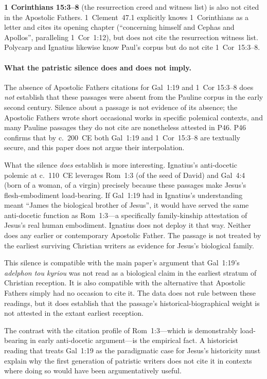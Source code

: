 \documentclass[12pt,oneside]{article}
\begin{document}
\textbf{1 Corinthians 15:3--8} (the resurrection creed and witness
list) is also not cited in the Apostolic Fathers.  1~Clement~47.1
explicitly knows 1~Corinthians as a letter and cites its
opening chapter (\enquote{concerning himself and Cephas and
Apollos}, paralleling 1~Cor~1:12), but does not cite the
resurrection witness list.  Polycarp and Ignatius likewise know
Paul's corpus but do not cite 1~Cor~15:3--8.

\paragraph{What the patristic silence does and does not imply.}
The absence of Apostolic Fathers citations for Gal~1:19 and 1~Cor
15:3--8 does \textit{not} establish that these passages were
absent from the Pauline corpus in the early second century.
Silence about a passage is not evidence of its absence; the
Apostolic Fathers wrote short occasional works in specific
polemical contexts, and many Pauline passages they do not cite
are nonetheless attested in P46.  P46 confirms that by c.~200~CE
both Gal~1:19 and 1~Cor~15:3--8 are textually secure, and this
paper does not argue their interpolation.

What the silence \textit{does} establish is more interesting.
Ignatius's anti-docetic polemic at c.~110~CE leverages Rom~1:3 (of
the seed of David) and Gal~4:4 (born of a woman, of a virgin)
precisely because these passages make Jesus's flesh-embodiment
load-bearing.  If Gal~1:19 had in Ignatius's understanding meant
\enquote{James the biological brother of Jesus}, it would have
served the same anti-docetic function as Rom~1:3---a
specifically family-kinship attestation of Jesus's real human
embodiment.  Ignatius does not deploy it that way.  Neither does
any earlier or contemporary Apostolic Father.  The passage is
not treated by the earliest surviving Christian writers as
evidence for Jesus's biological family.

This silence is compatible with the main paper's argument that
Gal~1:19's \textit{adelphon tou kyriou} was not read as a
biological claim in the earliest stratum of Christian reception.
It is also compatible with the alternative that Apostolic Fathers
simply had no occasion to cite it.  The data does not rule
between these readings, but it does establish that the passage's
historical-biographical weight is not attested in the extant
earliest reception.

The contrast with the citation profile of Rom~1:3---which is
demonstrably load-bearing in early anti-docetic argument---is the
empirical fact.  A historicist reading that treats Gal~1:19 as
the paradigmatic case for Jesus's historicity must explain why
the first generation of patristic writers does not cite it in
contexts where doing so would have been argumentatively useful.
\end{document}
